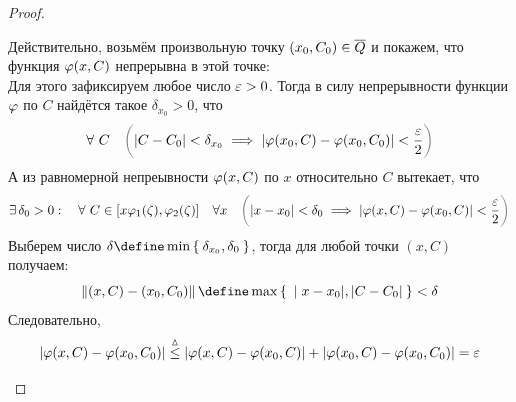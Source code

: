 \begin{proof}
\begin{enumerate}
        Действительно, возьмём произвольную точку $ (x_0, C_0) \in \overline{Q} $ и покажем, что функция $ \varphi(x, C) $ непрерывна в этой точке: \\
        Для этого зафиксируем любое число $ \varepsilon > 0 $. Тогда в силу непрерывности функции $ \varphi $ по $ C $ найдётся такое $ \delta_{x_0} > 0 $, что
        $$ \foral C \quad \nimp[\bigg(] |C - C_0| < \delta_{x_0} \implies |\vphi(x_0, C) - \vphi(x_0, C_0)| < \half[\veps] \nimp[\bigg)] $$
        А из равномерной непреывности $ \varphi(x, C) $ по $ x $ относительно $ C $ вытекает, что
        $$ \exist \delta_0 > 0 : \quad \foral C \in [x\vphi_1(\zeta), \vphi_2(\zeta)] \quad \forall x \quad \nimp[\bigg(] |x - x_0| < \delta_0 \implies |\vphi(x, C) - \vphi(x_0, C)| < \half[\veps] \nimp[\bigg)] $$
        Выберем число $ \delta \define \min\set{\delta_{x_0}, \delta_0} $, тогда для любой точки $ (x, C) $ получаем:
        $$ \norm{(x, C) - (x_0, C_0)} \define \max\set{|x - x_0|, |C - C_0|} < \delta $$
        Следовательно,
        $$ |\varphi(x, C) - \varphi(x_0, C_0)| \stackrel\vartriangle\le |\varphi(x, C) - \varphi(x_0, C)| + |\varphi(x_0, C) - \varphi(x_0, C_0)| = \varepsilon $$
    \end{enumerate}
\end{proof}

